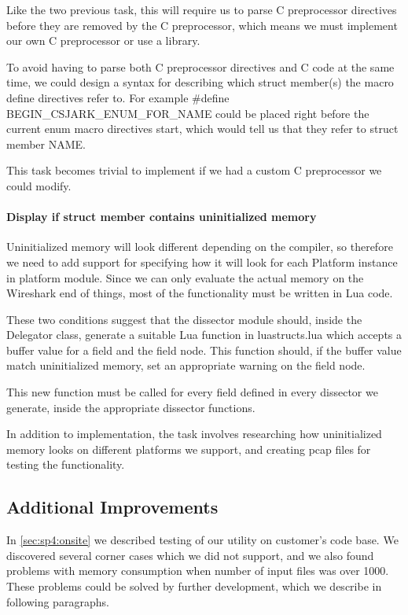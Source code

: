 Like the two previous task, this will require us to parse C preprocessor directives before they are removed by the C preprocessor, which means we must implement our own C preprocessor or use a library.

To avoid having to parse both C preprocessor directives and C code at the same time, we could design a syntax for describing which struct member(s) the macro define directives refer to. For example \#define BEGIN\_CSJARK\_ENUM\_FOR\_NAME could be placed right before the current enum macro directives start, which would tell us that they refer to struct member NAME.

This task becomes trivial to implement if we had a custom C preprocessor we could modify.

\paragraph{Display if struct member contains uninitialized memory}
Uninitialized memory will look different depending on the compiler, so therefore we need to add support for specifying how it will look for each Platform instance in platform module. Since we can only evaluate the actual memory on the Wireshark end of things, most of the functionality must be written in Lua code.

These two conditions suggest that the dissector module should, inside the Delegator class, generate a suitable Lua function in luastructs.lua which accepts a buffer value for a field and the field node. This function should, if the buffer value match uninitialized memory,  set an appropriate warning on the field node.

This new function must be called for every field defined in every dissector we generate, inside the appropriate dissector functions.

In addition to implementation, the task involves researching how uninitialized memory looks on different platforms we support, and creating pcap files for testing the functionality.

\subsection{Additional Improvements}
\label{sec:conc:addimps}
In \autoref{sec:sp4:onsite} we described testing of our utility on customer's
code base. We discovered several corner cases which we did not support, and we
also found problems with memory consumption when number of input files was
over 1000. These problems could be solved by further development, which we
describe in following paragraphs.

